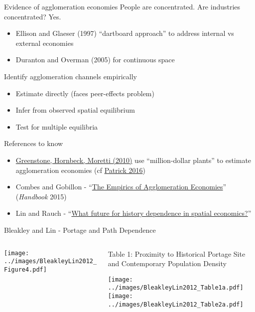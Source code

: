 \documentclass[10pt,notes=hide]{beamer}
\begin{document}
\begin{frame}{Evidence of agglomeration economies}
People are concentrated. Are industries concentrated? Yes.
\begin{itemize}
	\item Ellison and Glaeser (1997) ``dartboard approach'' to address internal vs external economies
	\item Duranton and Overman (2005) for continuous space
\end{itemize}
Identify agglomeration channels empirically
\begin{itemize}
	\item Estimate directly (faces peer-effects problem)
	\item Infer from observed spatial equilibrium
	\item Test for multiple equilibria
\end{itemize}
References to know
\begin{itemize}
	\item \href{https://www.journals.uchicago.edu/doi/abs/10.1086/653714}{Greenstone, Hornbeck, Moretti (2010)} use ``million-dollar plants'' to estimate agglomeration economies
  (cf \href{https://onlinelibrary.wiley.com/doi/abs/10.1111/ecin.12339}{Patrick 2016})
	\item Combes and Gobillon - ``\href{https://www.sciencedirect.com/science/article/pii/B9780444595171000052}{The Empirics of Agglomeration Economies}'' (\textit{Handbook} 2015)
	\item Lin and Rauch - ``\href{https://www.sciencedirect.com/science/article/pii/S0166046220303136}{What future for history dependence in spatial economics?}''
\end{itemize}
\end{frame}
\begin{frame}{Bleakley and Lin - Portage and Path Dependence}
\begin{columns}
\begin{column}{.49\textwidth}
\texttt{[image: ../images/BleakleyLin2012\_Figure4.pdf]}
\end{column}
\begin{column}{.49\textwidth}
{\tiny Table 1: Proximity to Historical Portage Site and Contemporary Population Density\par}
\texttt{[image: ../images/BleakleyLin2012\_Table1a.pdf]} \\
\texttt{[image: ../images/BleakleyLin2012\_Table2a.pdf]}
\end{column}
\end{columns}
\end{frame}
\end{document}

